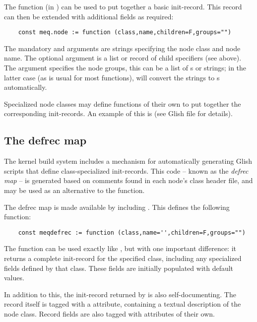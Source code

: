   The  function (in ) can be used to put
  together a basic init-record. This record can then be extended with
  additional fields as required:

  \begin{verbatim}
    const meq.node := function (class,name,children=F,groups="")
  \end{verbatim}
  
  The mandatory  and  arguments are strings specifying the
  node class and node name. The optional  argument is a list or
  record of child specifiers (see above). The  argument specifies
  the node groups, this can be a list of s or strings; in the latter
  case (as is usual for most  functions),  will convert
  the strings to s automatically.
  
  Specialized node classes may define functions of their own to put together the
  corresponding init-records. An example of this is  (see Glish
  file for details).
  
  \subsection{The defrec map}
  
  The kernel build system includes a mechanism for automatically generating
  Glish scripts that define class-specialized init-records. This code -- known
  as the {\em defrec map} -- is generated based on comments found in each
  node's class header file, and may be used as an alternative to the
   function.
  
  The defrec map is made available by including . This defines
  the following function:
  
  \begin{verbatim}
    const meqdefrec := function (class,name='',children=F,groups="")
  \end{verbatim}
  
  The function can be used exactly like , but with one important
  difference: it returns a complete init-record for the specified class,
  including any specialized fields defined by that class. These fields
  are initially populated with default values.
  
  In addition to this, the init-record returned by  is also
  self-documenting. The record itself is tagged with a 
  attribute, containing a textual description of the node class. Record fields
  are also tagged with  attributes of their own.

